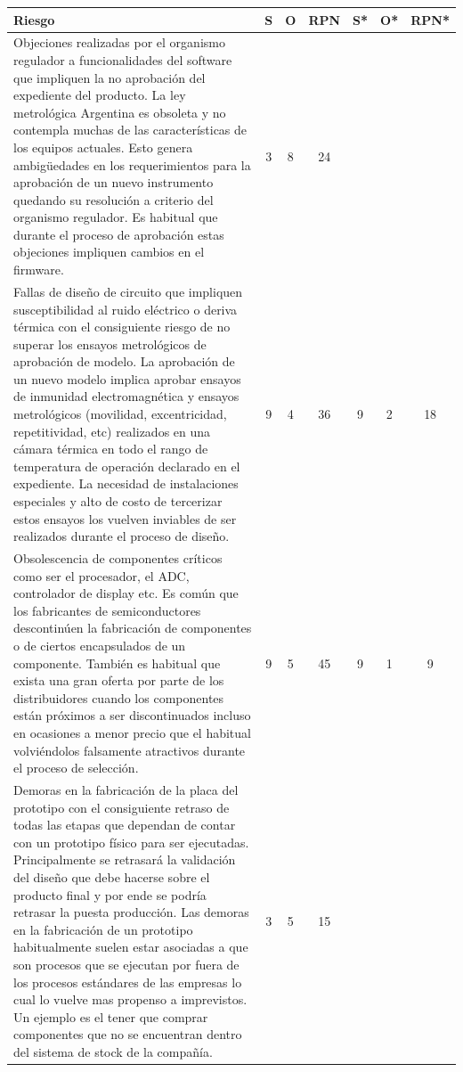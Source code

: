 \documentclass[11pt]{charter}
\begin{document}
\begin{table}[H]%
\centering
\begin{tabularx}{\linewidth}{@{}|X|c|c|c|c|c|c|@{}}
\hline
\rowcolor[HTML]{C0C0C0} 
Riesgo & S & O & RPN & S* & O* & RPN* \\ \hline

Objeciones realizadas por el organismo regulador a funcionalidades del software que impliquen la no aprobación del expediente del producto. La ley metrológica Argentina es obsoleta y no contempla muchas de las características de los equipos actuales. Esto genera ambigüedades en los requerimientos para la aprobación de un nuevo instrumento quedando su resolución a criterio del organismo regulador. Es habitual que durante el proceso de aprobación estas objeciones impliquen cambios en el firmware.    
& 3 & 8 & 24 & &  & \\ \hline

Fallas de diseño de circuito que impliquen susceptibilidad al ruido eléctrico o deriva térmica con el consiguiente riesgo de no superar los ensayos metrológicos de aprobación de modelo. La aprobación de un nuevo modelo implica aprobar ensayos de inmunidad electromagnética y ensayos metrológicos (movilidad, excentricidad, repetitividad, etc) realizados en una cámara térmica en todo el rango de temperatura de operación declarado en el expediente. La necesidad de instalaciones especiales y alto de costo de tercerizar estos ensayos los vuelven inviables de ser realizados durante el proceso de diseño.       
& 9 & 4 & 36 &  9  &  2  & 18     \\ \hline

Obsolescencia de componentes críticos como ser el procesador, el ADC, controlador de display etc. Es común que los fabricantes de semiconductores descontinúen la fabricación de componentes o de ciertos encapsulados de un componente. También es habitual que exista una gran oferta por parte de los distribuidores cuando los componentes están próximos a ser discontinuados incluso en ocasiones a menor precio que el habitual volviéndolos falsamente atractivos durante el proceso de selección.       
& 9  & 5  & 45 &  9  &  1  & 9     \\ \hline

Demoras en la fabricación de la placa del prototipo con el consiguiente retraso de todas las etapas que dependan de contar con un prototipo físico para ser ejecutadas. Principalmente se retrasará la validación del diseño que debe hacerse sobre el producto final y por ende se podría retrasar la puesta producción. Las demoras en la fabricación de un prototipo habitualmente suelen estar asociadas a que son procesos que se ejecutan por fuera de los procesos estándares de las empresas lo cual lo vuelve mas propenso a imprevistos. Un ejemplo es el tener que comprar componentes que no se encuentran dentro del sistema de stock de la compañía. 
& 3  & 5  & 15 &    &    &      \\ \hline


\end{tabularx}
\end{table}
\end{document}
